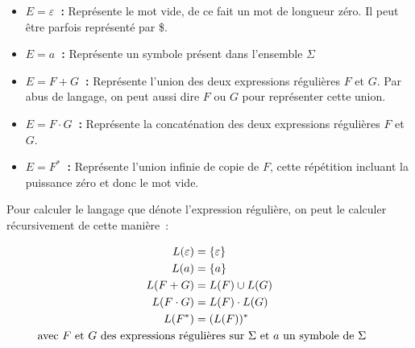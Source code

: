 \vphantom{}

\begin{itemize}
    \item[\textbullet] \textbf{\(E = \varepsilon\)~:}
        Représente le mot vide, de ce fait un mot de longueur zéro. Il peut être
        parfois représenté par \og{}\$\fg{}.

        \vphantom{}

    \item[\textbullet] \textbf{\(E = a\)~:} Représente un symbole
        présent dans l'ensemble \(\Sigma\)

        \vphantom{}

    \item[\textbullet] \textbf{\(E = F + G\)~:} Représente l'union
        des deux expressions régulières \(F\) et \(G\). Par abus de langage, on
        peut aussi dire \(F\) \og{}ou\fg{} \(G\) pour représenter cette union.

        \vphantom{}

    \item[\textbullet] \textbf{\(E = F \cdot G\)~:}
        Représente la concaténation des deux expressions régulières \(F\) et
        \(G\).

        \vphantom{}

    \item[\textbullet] \textbf{\(E = F^* \)~:} Représente l'union infinie de
        copie de \(F\), cette répétition incluant la puissance zéro et donc le
        mot vide.
\end{itemize}

\vphantom{}

Pour calculer le langage que dénote l'expression régulière, on peut le calculer
récursivement de cette manière~:

\begin{align*}
    L(\varepsilon) & = \{\varepsilon\} \\
    L(a) & = \{a\}           \\
    L(F + G) & = L(F) \cup L(G)  \\
    L(F \cdot G) & = L(F) \cdot L(G) \\
    L(F^*) & = (L(F))^*        \\
    \makebox[0pt][c]{
        \phantom{E } \text{
            avec \(F\) et \(G\) des expressions régulières sur \(\Sigma\) et \(a\)
            un symbole de \(\Sigma\)
        }
    } \notag
\end{align*}

